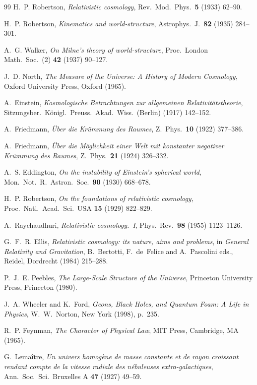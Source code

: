 \documentclass[11pt,a4paper]{article}
\begin{document}
\begin{thebibliography}{99}
H.~P. Robertson,
\emph{Relativistic cosmology},
Rev.~Mod.~Phys.~\textbf{5} (1933) 62--90.

H.~P. Robertson,
\emph{Kinematics and world-structure},
Astrophys.~J.~\textbf{82} (1935) 284--301.

A.~G. Walker,
\emph{On Milne's theory of world-structure},
Proc.~London Math.~Soc.~(2) \textbf{42} (1937) 90--127.

J.~D. North,
\emph{The Measure of the Universe: A History of Modern Cosmology},
Oxford University Press, Oxford (1965).

A.~Einstein,
\emph{Kosmologische Betrachtungen zur allgemeinen Relativit\"atstheorie},
Sitzungsber.~K\"onigl.~Preuss.~Akad.~Wiss.~(Berlin) (1917) 142--152.

A.~Friedmann,
\emph{\"Uber die Kr\"ummung des Raumes},
Z.~Phys.~\textbf{10} (1922) 377--386.

A.~Friedmann,
\emph{\"Uber die M\"oglichkeit einer Welt mit konstanter negativer Kr\"ummung des Raumes},
Z.~Phys.~\textbf{21} (1924) 326--332.

A.~S. Eddington,
\emph{On the instability of Einstein's spherical world},
Mon.~Not.~R.~Astron.~Soc.~\textbf{90} (1930) 668--678.

H.~P. Robertson,
\emph{On the foundations of relativistic cosmology},
Proc.~Natl.~Acad.~Sci.~USA \textbf{15} (1929) 822--829.

A.~Raychaudhuri,
\emph{Relativistic cosmology.~I},
Phys.~Rev.~\textbf{98} (1955) 1123--1126.

G.~F.~R. Ellis,
\emph{Relativistic cosmology: its nature, aims and problems},
in \emph{General Relativity and Gravitation}, B.~Bertotti, F.~de~Felice and A.~Pascolini eds., Reidel, Dordrecht (1984) 215--288.

P.~J.~E. Peebles,
\emph{The Large-Scale Structure of the Universe},
Princeton University Press, Princeton (1980).

J.~A. Wheeler and K.~Ford,
\emph{Geons, Black Holes, and Quantum Foam: A Life in Physics},
W.~W.~Norton, New York (1998), p.~235.

R.~P. Feynman,
\emph{The Character of Physical Law},
MIT Press, Cambridge, MA (1965).

G.~Lema\^itre,
\emph{Un univers homog\`ene de masse constante et de rayon croissant rendant compte de la vitesse radiale des n\'ebuleuses extra-galactiques},
Ann.~Soc.~Sci.~Bruxelles A \textbf{47} (1927) 49--59.


\end{thebibliography}
\end{document}
